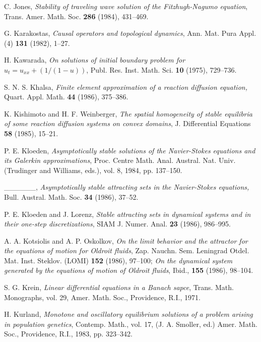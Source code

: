 \documentclass{surv-l}
\theoremstyle{plain}
\theoremstyle{definition}
\numberwithin{equation}{section}
\numberwithin{figure}{chapter}
\begin{document}
\begin{thebibliography}{}
C. Jones, \emph{Stability of traveling wave solution of the Fitzhugh-Nagumo equation},
Trans. Amer. Math. Soc. \textbf{286} (1984), 431--469.

G. Karakostas, \emph{Causal operators and topological dynamics}, Ann. Mat. Pura Appl. (4) \textbf{131} (1982), 1--27.

H. Kawarada, \emph{On solutions of initial boundary problem for} $u_t = u_{xx} + (1/(1- u))$, Publ. Res. Inst. Math. Sci. \textbf{10} (1975), 729--736.

S. N. S. Khalsa, \emph{Finite element approximation of a reaction diffusion equation,}
Quart. Appl. Math. \textbf{44} (1986), 375--386.

K. Kishimoto and H. F. Weinberger, \emph{The spatial homogeneity of stable equilibria of some reaction diffusion systems on convex domains}, J. Differential Equations \textbf{58} (1985), 15--21.

P. E. Kloeden, \emph{Asymptotically stable solutions of the Navier-Stokes equations and its Galerkin approximations}, Proc. Centre Math. Anal. Austral. Nat. Univ. (Trudinger and
Williams, eds.), vol. 8, 1984, pp. 137--150.

 \_\_\_\_\_\_, \emph{Asymptotically stable attracting sets in the Navier-Stokes equations,}
Bull. Austral. Math. Soc. \textbf{34} (1986), 37--52.

P. E. Kloeden and J. Lorenz, \emph{Stable attracting sets in dynamical systems and in their one-step discretizations}, SIAM J. Numer. Anal. \textbf{23} (1986),
986--995.

A. A. Kotsiolis and A. P. Oskolkov, \emph{On the limit behavior and the attractor for the equations of motion for Oldroit fluids}, Zap. Nauchn. Sem. Leningrad Otdel. Mat.
Inst. Steklov. (LOMI) \textbf{152} (1986), 97--100; \emph{On the dynamical system generated by the equations of motion of Oldroit fluids}, Ibid., \textbf{155} (1986), 98--104.

S. G. Krein, \emph{Linear differential equations in a Banach sapce}, Trans. Math. Monographs, vol. 29, Amer. Math. Soc., Providence, R.I., 1971.

H. Kurland, \emph{Monotone and oscillatory equilibrium solutions of a problem arising in population genetics}, Contemp. Math., vol. 17, (J. A. Smoller, ed.) Amer.
Math. Soc., Providence, R.I., 1983, pp. 323--342.


\end{thebibliography}
\end{document}
